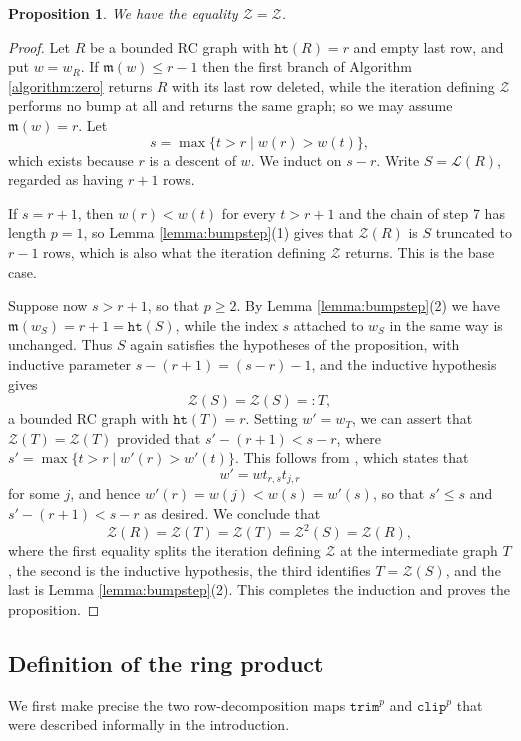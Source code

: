 \documentclass{amsart}
\newtheorem{proposition}[lemma]{Proposition}
\theoremstyle{definition}
\theoremstyle{remark}
\numberwithin{equation}{subsection}
\newcommand{\wof}[1]{w_{#1}}
\newcommand{\trm}{\mathtt{trim}}
\newcommand{\zeromap}{\mathcal{Z}}
\newcommand{\hr}{\mathtt{ht}}
\newcommand{\clp}{\mathtt{clip}}
\newcommand{\lzeromap}{\mathscr{Z}}
\newcommand{\lmap}{\mathscr{L}}
\newcommand{\maxd}{\mathfrak{m}}
\begin{document}
\begin{proposition} \label{proposition:zerocrystal}
We have the equality $\lzeromap=\zeromap$.
\end{proposition}
\begin{proof}
Let $R$ be a bounded RC graph with $\hr(R)=r$ and empty last row, and put $w=\wof R$. If $\maxd(w)\leq r-1$ then the first branch of Algorithm \ref{algorithm:zero} returns $R$ with its last row deleted, while the iteration defining $\lzeromap$ performs no bump at all and returns the same graph; so we may assume $\maxd(w)=r$. Let
$$s=\max\{t>r \mid w(r)>w(t)\},$$
which exists because $r$ is a descent of $w$. We induct on $s-r$. Write $S=\lmap(R)$, regarded as having $r+1$ rows.

If $s=r+1$, then $w(r)<w(t)$ for every $t>r+1$ and the chain of step 7 has length $p=1$, so Lemma \ref{lemma:bumpstep}(1) gives that $\zeromap(R)$ is $S$ truncated to $r-1$ rows, which is also what the iteration defining $\lzeromap$ returns. This is the base case.

Suppose now $s>r+1$, so that $p\geq 2$. By Lemma \ref{lemma:bumpstep}(2) we have $\maxd(\wof S)=r+1=\hr(S)$, while the index $s$ attached to $\wof S$ in the same way is unchanged. Thus $S$ again satisfies the hypotheses of the proposition, with inductive parameter $s-(r+1)=(s-r)-1$, and the inductive hypothesis gives
$$\lzeromap(S)=\zeromap(S)=:T,$$
a bounded RC graph with $\hr(T)=r$. Setting $w'=\wof{T}$, we can assert that $\zeromap(T) = \lzeromap(T)$ provided that $s' - (r + 1) < s - r$, where $s' = \max\{t>r \mid w'(r)>w'(t)\}$. This follows from \cite[Lemma~6]{little2003combinatorial}, which states that
$$w' = wt_{r,s}t_{j,r}$$
for some $j$, and hence $w'(r) = w(j) < w(s) = w'(s)$, so that $s' \leq s$ and $s' - (r + 1) < s - r$ as desired. We conclude that 
$$\lzeromap(R)=\lzeromap(T) = \zeromap(T) = \zeromap^{2}(S) = \zeromap(R),$$
where the first equality splits the iteration defining $\lzeromap$ at the intermediate graph $T$, the second is the inductive hypothesis, the third identifies $T=\zeromap(S)$, and the last is Lemma \ref{lemma:bumpstep}(2). This completes the induction and proves the proposition.
\end{proof}

\subsection{Definition of the ring product}\label{section:ringproduct}

We first make precise the two row-decomposition maps $\trm^p$ and $\clp^p$ that were described informally in the introduction.
\end{document}
